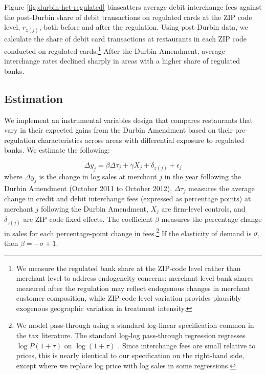 \documentclass[main.tex]{subfiles}
\begin{document}
Figure \ref{fig:durbin-het-regulated} binscatters average debit interchange fees against the post-Durbin share of debit transactions on regulated cards at the ZIP code level, $r_{z(j)}$, both before and after the regulation.
Using post-Durbin data, we calculate the share of debit card transactions at restaurants in each ZIP code conducted on regulated cards.\footnote{ We measure the regulated bank share at the ZIP-code level rather than merchant level to address endogeneity concerns: merchant-level bank shares measured after the regulation may reflect endogenous changes in merchant customer composition, while ZIP-code level variation provides plausibly exogenous geographic variation in treatment intensity. } After the Durbin Amendment, average interchange rates declined sharply in areas with a higher share of regulated banks.

\subsection{Estimation}

We implement an instrumental variables design that compares restaurants that vary in their expected gains from the Durbin Amendment based on their pre-regulation characteristics across areas with differential exposure to regulated banks.
We estimate the following:

\begin{equation}
\Delta y_{j}=\beta\Delta\tau_{j} + \gamma X_j + \delta_{z(j)} + \epsilon_{j}\label{eq:durbin}
\end{equation}
where $\Delta y_{j}$ is the change in log sales at merchant $j$ in the year following the Durbin Amendment (October 2011 to October 2012), $\Delta\tau_{j}$ measures the average change in credit and debit interchange fees (expressed as percentage points) at merchant $j$ following the Durbin Amendment, $X_j$ are firm-level controls, and $\delta_{z(j)}$ are ZIP-code fixed effects.
The coefficient $\beta$ measures the percentage change in sales for each percentage-point change in fees.\footnote{ We model pass-through using a standard log-linear specification common in the tax literature.
The standard log-log pass-through regression regresses $\log P\left(1+\tau\right)$ on $\log\left(1+\tau\right)$ \citep{Butters.etal2022}.
Since interchange fees are small relative to prices, this is nearly identical to our specification on the right-hand side, except where we replace log price with log sales in some regressions.} If the elasticity of demand is $\sigma$, then $\beta = -\sigma + 1$.
\end{document}
